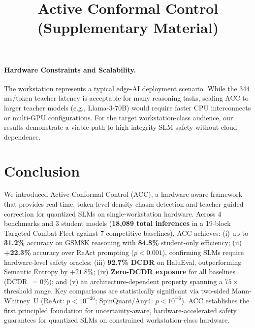 \documentclass[runningheads]{article} %
\begin{document}
\paragraph{Hardware Constraints and Scalability.}
The workstation represents a typical edge-AI deployment scenario.
While the 344\,ms/token teacher latency is acceptable for many reasoning
tasks, scaling ACC to larger teacher models (e.g., Llama-3-70B)
would require faster CPU interconnects or multi-GPU configurations.
For the target workstation-class audience, our results demonstrate a
viable path to high-integrity SLM safety without cloud dependence.

\section{Conclusion}
\enlargethispage{2\baselineskip}
\label{sec:conclusion}

We introduced Active Conformal Control (ACC), a hardware-aware framework
that provides real-time, token-level density chasm detection and
teacher-guided correction for quantized SLMs on single-workstation hardware.
Across 4 benchmarks and 3 student models (\textbf{18,089 total inferences}
in a 19-block Targeted Combat Fleet against 7 competitive baselines),
ACC achieves: (i) up to \textbf{31.2\%} accuracy on GSM8K reasoning with \textbf{84.8\%} student-only efficiency; (ii) \textbf{+22.3\%} accuracy over ReAct prompting ($p < 0.001$), confirming SLMs require hardware-level safety oracles; (iii) \textbf{92.7\% DCDR} on HaluEval, outperforming Semantic Entropy by $+21.8\%$; (iv) \textbf{Zero-DCDR exposure} for all baselines (DCDR~$=0\%$); and (v) an architecture-dependent property spanning a $75\times$ threshold range.
Key comparisons are statistically significant via two-sided Mann-Whitney~U
(ReAct: $p<10^{-26}$; SpinQuant/Any4: $p<10^{-6}$).
ACC establishes the first principled foundation for uncertainty-aware,
hardware-accelerated safety guarantees for quantized SLMs on
constrained workstation-class hardware.


{\small

}

\newpage
\onecolumn
\title{Active Conformal Control\\(Supplementary Material)}
\maketitle
\end{document}
